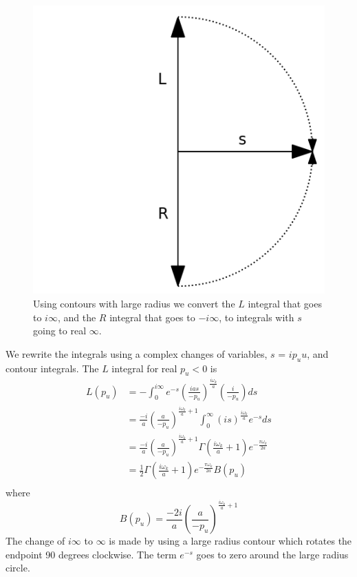 \documentclass[12pt,a4paper]{article}
\begin{document}
\begin{figure}[h]
\centering
\includegraphics[scale=0.3]{contour.png}
\caption{Using contours with large radius we convert the $L$ integral that goes to $i\infty$, and the $R$ integral that goes to $-i\infty$, to integrals with $s$ going to real $\infty$.}
\label{fig:x cubed graph}
\end{figure}

We rewrite the integrals using a complex changes of variables, $s$ = $ip_uu$, and contour integrals.
The $L$ integral for real $p_u<0$ is
\begin{equation}
\begin{split}
  L(p_u) & = -\int_0^{i\infty} e^{-s}\left(\frac{ias}{-p_u}\right)^\frac{i\omega_k}{a} \left(\frac{i}{-p_u}\right)ds \\
  & = \frac{-i}{a} \left(\frac{a}{-p_u}\right)^{\frac{i\omega_k}{a} + 1} \int_0^\infty \left(is\right) ^ \frac{i\omega_k}{a} e^{-s} ds \\
  & = \frac{-i}{a} \left(\frac{a}{-p_u}\right)^{\frac{i\omega_k}{a} + 1} \Gamma\left(\frac{i\omega_k}{a} + 1\right) e^{-\frac{\pi \omega_k}{2a}} \\
  & = \frac{1}{2} \Gamma\left(\frac{i\omega_k}{a} + 1\right) e^{-\frac{\pi \omega_k}{2a}} B(p_u)\\
\end{split}
\end{equation}
where
\begin{equation}
B(p_u) = \frac{-2i}{a} \left(\frac{a}{-p_u}\right)^{\frac{i\omega_k}{a} + 1} 
\end{equation}
The change of $i\infty$ to $\infty$ is made by using a large radius contour which rotates the endpoint 90 degrees clockwise.  The term $e^{-s}$ goes to zero around the large radius circle.
\end{document}
